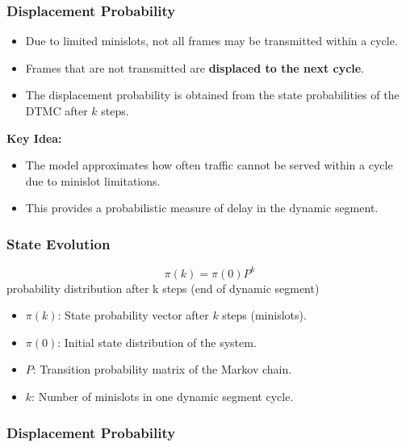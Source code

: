 \subsubsection*{Displacement Probability}

\begin{itemize}
    \item Due to limited minislots, not all frames may be transmitted within a cycle.
    
    \item Frames that are not transmitted are \textbf{displaced to the next cycle}.
    
    \item The displacement probability is obtained from the state probabilities of the DTMC after $k$ steps.
\end{itemize}
\begin{mdframed}[backgroundcolor=lightgray, linewidth=0pt, innertopmargin=8pt,
innerbottommargin=8pt]
\textbf{Key Idea:}
\begin{itemize}
    \item The model approximates how often traffic cannot be served within a cycle due to minislot limitations.
    \item This provides a probabilistic measure of delay in the dynamic segment.
\end{itemize}
\end{mdframed}
\subsubsection*{State Evolution}

\[
\pi(k) = \pi(0) P^{k}
\]
probability distribution after k steps (end of dynamic segment)
\begin{itemize}
    \item $\pi(k)$: State probability vector after $k$ steps (minislots).
    
    \item $\pi(0)$: Initial state distribution of the system.
    
    \item $P$: Transition probability matrix of the Markov chain.
    
    \item $k$: Number of minislots in one dynamic segment cycle.
\end{itemize}
\subsubsection*{Displacement Probability}

